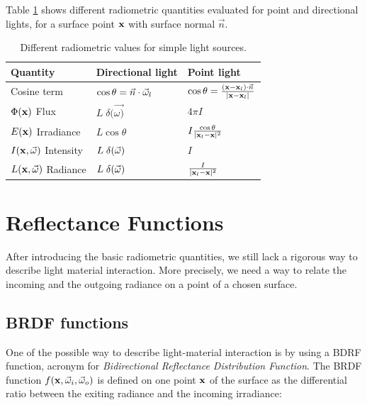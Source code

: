 Table \ref{table:radio} shows different radiometric quantities evaluated for point and directional lights, for a surface point $\mathbf{x}$ with surface normal $\vec{n}$. 

\renewcommand{\arraystretch}{1.8}
\begin{table}[!ht]
    \centering
    \begin{tabularx}{0.95\textwidth}{|X|X|X|}
    \hline
    Quantity   & Directional light & Point light \\ \hline
    Cosine term       & $\cos\theta = \vec{n} \cdot \vec{\omega}_l$ & $\cos\theta = \frac{(\mathbf{x} - \mathbf{x}_l) \cdot \vec{n}}{|\mathbf{x} - \mathbf{x}_l|}$     \\ \hline
    $\Phi(\mathbf{x})$ Flux       & $L\; \delta(\vec{\omega)}$                  & $4 \pi I$           \\ \hline
    $E(\mathbf{x})$ Irradiance & $L \cos\theta $                 & $I \frac{\cos\theta}{|\mathbf{x}_l - \mathbf{x}|^2}$          \\ \hline
    $I(\mathbf{x},\vec{\omega})$ Intensity  & $L\; \delta(\vec{\omega})$                 & $I$           \\ \hline
    $L(\mathbf{x},\vec{\omega})$ Radiance   & $L\; \delta(\vec{\omega})$               & $\frac{I}{|\mathbf{x}_l - \mathbf{x}|^2}$           \\ \hline
    \end{tabularx}
\caption{Different radiometric values for simple light sources.}
\label{table:radio}
\end{table}

\section{Reflectance Functions}
 
After introducing the basic radiometric quantities, we still lack a rigorous way to describe light material interaction. More precisely, we need a way to relate the incoming and the outgoing radiance on a point of a chosen surface. 

\subsection{BRDF functions}
\label{sec:brdf}
One of the possible way to describe light-material interaction is by using a BDRF function, acronym for \emph{Bidirectional Reflectance Distribution Function}. The BRDF function $f(\mathbf{x}, \vec{\omega}_i, \vec{\omega}_o)$ is defined on one point $\mathbf{x}$ of the surface as the differential ratio between the exiting radiance and the incoming irradiance:

